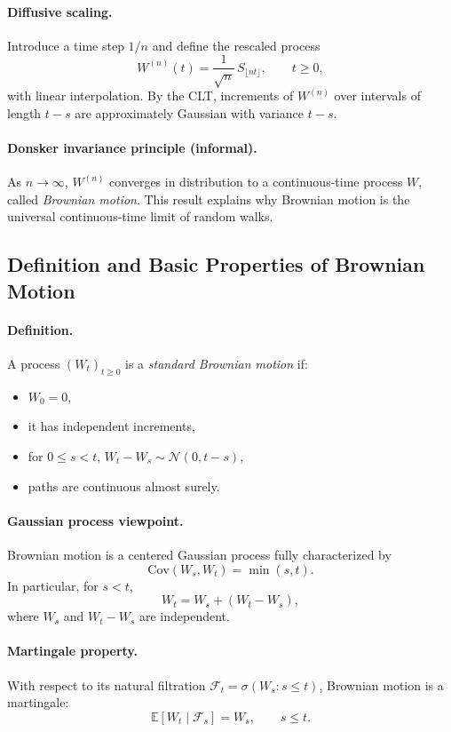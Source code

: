 \documentclass[11pt]{article}
\newcommand{\E}{\mathbb{E}}
\newcommand{\Cov}{\mathrm{Cov}}
\newcommand{\1}{\mathbf{1}}
\theoremstyle{plain}
\theoremstyle{definition}
\theoremstyle{remark}
\begin{document}
\paragraph{Diffusive scaling.}
Introduce a time step $1/n$ and define the rescaled process
\[
W^{(n)}(t)=\frac{1}{\sqrt{n}}\,S_{\lfloor nt\rfloor},
\qquad t\ge0,
\]
with linear interpolation.
By the CLT, increments of $W^{(n)}$ over intervals of length $t-s$
are approximately Gaussian with variance $t-s$.

\paragraph{Donsker invariance principle (informal).}
As $n\to\infty$, $W^{(n)}$ converges in distribution to a continuous-time
process $W$, called \emph{Brownian motion}.
This result explains why Brownian motion is the universal
continuous-time limit of random walks.

\subsection{Definition and Basic Properties of Brownian Motion}

\paragraph{Definition.}
A process $(W_t)_{t\ge0}$ is a \emph{standard Brownian motion} if:
\begin{itemize}
  \item $W_0=0$,
  \item it has independent increments,
  \item for $0\le s<t$, $W_t-W_s\sim\mathcal N(0,t-s)$,
  \item paths are continuous almost surely.
\end{itemize}

\paragraph{Gaussian process viewpoint.}
Brownian motion is a centered Gaussian process fully characterized by
\[
\Cov(W_s,W_t)=\min(s,t).
\]
In particular, for $s<t$,
\[
W_t=W_s+(W_t-W_s),
\]
where $W_s$ and $W_t-W_s$ are independent.

\paragraph{Martingale property.}
With respect to its natural filtration $\mathcal F_t=\sigma(W_s:s\le t)$,
Brownian motion is a martingale:
\[
\E[W_t\mid\mathcal F_s]=W_s,\qquad s\le t.
\]
\end{document}
